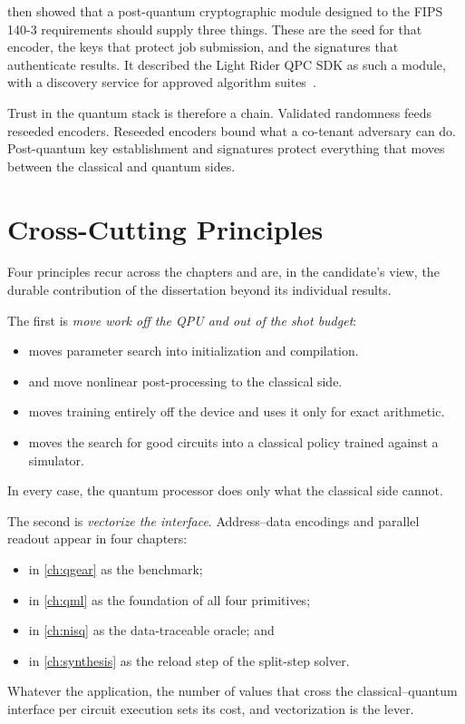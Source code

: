  then showed that a post-quantum cryptographic module designed to the FIPS 140-3 requirements should supply three things. These are the seed for that encoder, the keys that protect job submission, and the signatures that authenticate results. It described the Light Rider QPC SDK as such a module, with a discovery service for approved algorithm suites~\cite{guo2026lightriderqpc}.

Trust in the quantum stack is therefore a chain. Validated randomness feeds reseeded encoders. Reseeded encoders bound what a co-tenant adversary can do. Post-quantum key establishment and signatures protect everything that moves between the classical and quantum sides.

\section{Cross-Cutting Principles}\label{sec:conclusion:principles}

Four principles recur across the chapters and are, in the candidate's view, the durable contribution of the dissertation beyond its individual results.

The first is \emph{move work off the QPU and out of the shot budget}:
\begin{itemize}
  \item \deal{} moves parameter search into initialization and compilation.
  \item \qawa{} and \vqt{} move nonlinear post-processing to the classical side.
  \item \nnqa{} moves training entirely off the device and uses it only for exact arithmetic.
  \item \rubriq{} moves the search for good circuits into a classical policy trained against a simulator.
\end{itemize}
In every case, the quantum processor does only what the classical side cannot.

The second is \emph{vectorize the interface}. Address--data encodings and parallel readout appear in four chapters:
\begin{itemize}
  \item in \cref{ch:qgear} as the \qcrank{} benchmark;
  \item in \cref{ch:qml} as the foundation of all four primitives;
  \item in \cref{ch:nisq} as the data-traceable oracle; and
  \item in \cref{ch:synthesis} as the reload step of the split-step solver.
\end{itemize}
Whatever the application, the number of values that cross the classical--quantum interface per circuit execution sets its cost, and vectorization is the lever.

